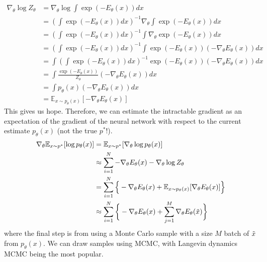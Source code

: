   \begin{align}
    \nabla_\theta \log Z_\theta & = \nabla_\theta \log \int \exp(-E_\theta(x))dx \\
                                & = \left(\int \exp(-E_\theta(x))dx\right)^{-1} \nabla_\theta \int \exp(-E_\theta(x))dx \\
                                & = \left(\int \exp(-E_\theta(x))dx\right)^{-1} \int \nabla_\theta \exp(-E_\theta(x))dx \\
                                & = \left(\int \exp(-E_\theta(x))dx\right)^{-1} \int \exp(-E_\theta(x))(-\nabla_\theta E_\theta(x))dx \\
                                & = \int \left(\int \exp(-E_\theta(x))dx\right)^{-1} \exp(-E_\theta(x))(-\nabla_\theta E_\theta(x))dx \\
                                & = \int \frac{\exp(-E_\theta(x))}{Z_\theta}(-\nabla_\theta E_\theta(x))dx \\
                                & = \int p_\theta(x)(-\nabla_\theta E_\theta(x))dx \\
                                & = \mathbb{E}_{x\sim p_\theta(x)}[-\nabla_\theta E_\theta(x)]
  \end{align}
  This gives us hope. Therefore, we can estimate the intractable gradient as an expectation of the gradient of the neural network with respect to the current estimate $p_\theta (x)$ (not the true $p^\ast$!). 
  \begin{align}
    \nabla_\theta \mathbb{E}_{x \sim p^\ast} [ \log p_\theta (x)] & = \mathbb{E}_{x \sim p^\ast} [ \nabla_\theta \log p_\theta (x) ] \\
                                                                  & \approx \sum_{i=1}^N - \nabla_\theta E_\theta (x) - \nabla_\theta \log Z_\theta \\
                                                                  & = \sum_{i=1}^N \Big\{ -\nabla_\theta E_\theta (x) + \mathbb{E}_{x \sim p_\theta (x)} [ \nabla_\theta E_\theta (x)] \Big\} \\
                                                                  & \approx \sum_{i=1}^N \bigg\{ -\nabla_\theta E_\theta (x) +  \sum_{j=1}^M \nabla_\theta E_\theta (\Tilde{x}) \bigg\}
  \end{align}
  where the final step is from using a Monte Carlo sample with a size $M$ batch of $\Tilde{x}$ from $p_\theta (x)$. We can draw samples using MCMC, with Langevin dynamics MCMC being the most popular. 

